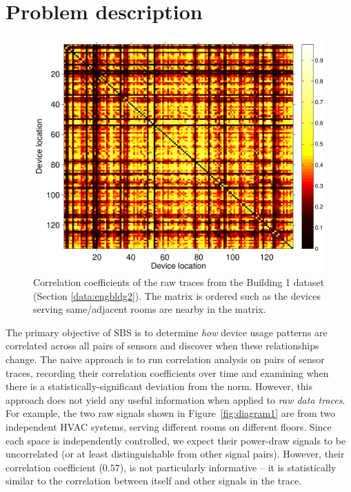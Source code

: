 \section{Problem description}
\begin{figure}
\begin{center}
\includegraphics[width=.5\textwidth]{img/heatMap_raw_201106-eps-converted-to.pdf}
\caption{Correlation coefficients of the raw traces from the Building 1 dataset (Section \ref{data:engbldg2}).
The matrix is ordered such as the devices serving same/adjacent rooms are nearby in the matrix.}
\label{fig:heatmap:raw}
\end{center}
\end{figure}

The primary objective of SBS is to determine \emph{how} device usage patterns are correlated across all pairs of sensors and 
discover when these relationships change.  
The naive approach is to run correlation analysis on pairs of sensor traces, recording their correlation coefficients over time and 
examining when there is a statistically-significant deviation from the norm.  
However, this approach does not yield any useful information when applied to \emph{raw data traces}.
For example, the two raw signals shown in Figure~\ref{fig:diagram1} are from two independent HVAC systems,
 serving different rooms on different floors.
Since each space is independently controlled, we expect their power-draw signals to be uncorrelated (or at least distinguishable 
from other signal pairs).  However, their correlation coefficient ($0.57$), is not particularly informative -- it is statistically
similar to the correlation between itself and other signals in the trace.  

